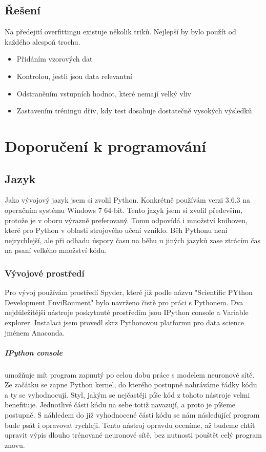 \documentclass[12pt,a4paper]{report}
\begin{document}
	\section{Řešení}
	Na předejití overfittingu existuje několik triků. Nejlepší by bylo použít od každého alespoň trochu.
	\begin{itemize}
		\item Přidáním vzorových dat
		\item Kontrolou, jestli jsou data relevantní
		\item Odstraněním vstupních hodnot, které nemají velký vliv
		\item Zastavením tréningu dřív, kdy test dosahuje dostatečně vysokých výsledků
	\end{itemize}
	

\chapter{Doporučení k programování}
	\section{Jazyk}
	Jako vývojový jazyk jsem si zvolil Python. Konkrétně používám verzi 3.6.3 na operačním systému Windows 7 64-bit. Tento jazyk jsem si zvolil především, protože je v oboru výrazně preferovaný. Tomu odpovídá i množství knihoven, které pro Python v oblasti strojového učení vzniklo. Běh Pythonu není nejrychlejší, ale při odhadu úspory času na běhu u jiných jazyků zase ztrácím čas na psaní velkého množství kódu.
		\subsection{Vývojové prostředí}
		Pro vývoj používám prostředí Spyder, které již podle názvu "Scientific PYthon Development EnviRonment" bylo navrženo čistě pro práci s Pythonem. Dva nejdůležitější nástroje poskytnuté prostředím jsou IPython console a Variable explorer. Instalaci jsem provedl skrz Pythonovou platformu pro data science jménem Anaconda.
		\paragraph{IPython console}
		umožňuje mít program zapnutý po celou dobu práce s modelem neuronové sítě. Ze začátku se zapne Python kernel, do kterého postupně nahráváme řádky kódu a ty se vyhodnocují. Styl, jakým se nejčastěji píše kód z tohoto nástroje velmi benefituje. Jednotlivé části kódu na sebe totiž navazují, a proto je píšeme postupně. S náhledem do již vyhodnocené části kódu se nám následující program bude psát i opravovat rychleji. Tento nástroj opravdu oceníme, až budeme chtít upravit výpis dlouho trénované neuronové sítě, bez nutnosti pouštět celý program znovu.
\end{document}
